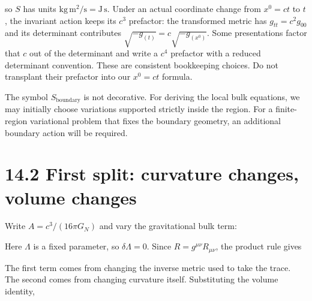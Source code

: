 \documentclass[
  11pt,
  letterpaper,
  oneside,
  openany]{scrbook}
\begin{document}
so \(S\) has units \(\mathrm{kg\,m^2/s}=\mathrm{J\,s}\). Under an actual
coordinate change from \(x^0=ct\) to \(t\), the invariant action keeps
its \(c^3\) prefactor: the transformed metric has \(g_{tt}=c^2g_{00}\)
and its determinant contributes \(\sqrt{-g_{(t)}}=c\sqrt{-g_{(x^0)}}\).
Some presentations factor that \(c\) out of the determinant and write a
\(c^4\) prefactor with a reduced determinant convention. These are
consistent bookkeeping choices. Do not transplant their prefactor into
our \(x^0=ct\) formula.

The symbol \(S_{\mathrm{boundary}}\) is not decorative. For deriving the
local bulk equations, we may initially choose variations supported
strictly inside the region. For a finite-region variational problem that
fixes the boundary geometry, an additional boundary action will be
required.

\hypertarget{first-split-curvature-changes-volume-changes}{%
\section{14.2 First split: curvature changes, volume
changes}\label{first-split-curvature-changes-volume-changes}}

Write \(A=c^3/(16\pi G_N)\) and vary the gravitational bulk term:

\begin{center}
\begingroup
{}
\ifdim\wd\grmathbox>\linewidth
\resizebox{\linewidth}{!}{\usebox{\grmathbox}}
\else\usebox{\grmathbox}\fi
\endgroup
\end{center}

Here \(\Lambda\) is a fixed parameter, so \(\delta\Lambda=0\). Since
\(R=g^{\mu\nu}R_{\mu\nu}\), the product rule gives

\begin{center}
\begingroup
{}
\ifdim\wd\grmathbox>\linewidth
\resizebox{\linewidth}{!}{\usebox{\grmathbox}}
\else\usebox{\grmathbox}\fi
\endgroup
\end{center}

The first term comes from changing the inverse metric used to take the
trace. The second comes from changing curvature itself. Substituting the
volume identity,
\end{document}
